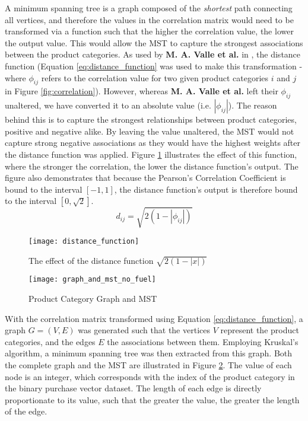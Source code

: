 A minimum spanning tree is a graph composed of the \textit{shortest} path connecting all vertices, and therefore the values in the correlation matrix would need to be transformed via a function such that the higher the correlation value, the lower the output value. This would allow the MST to capture the strongest associations between the product categories. As used by \textbf{M. A. Valle et al.} in , the distance function (Equation \ref{eq:distance_function}  was used to make this transformation - where $\phi_{ij}$ refers to the correlation value for two given product categories $i$ and $j$ in Figure \ref{fig:correlation}). However, whereas \textbf{M. A. Valle et al.} left their $\phi_{ij}$ unaltered, we have converted it to an absolute value (i.e. $|\phi_{ij}|$). The reason behind this is to capture the strongest relationships between product categories, positive and negative alike. By leaving the value unaltered, the MST would not capture strong negative associations as they would have the highest weights after the distance function was applied. Figure \ref{fig:distance_function} illustrates the effect of this function, where the stronger the correlation, the lower the distance function's output. The figure also demonstrates that because the Pearson's Correlation Coefficient is bound to the interval $[-1,1]$, the distance function's output is therefore bound to the interval $[0,\sqrt{2}]$. 
\begin{equation}
\label{eq:distance_function}
d_{ij} = \sqrt{2(1-|\phi_{ij}|)}
\end{equation}

\begin{figure}[H]
\centering
\texttt{[image: distance\_function]}
\label{fig:distance_function}
\caption{The effect of the distance function $\sqrt{2(1-|x|)}$}
\end{figure}

\begin{figure}[H]
\centering
\texttt{[image: graph\_and\_mst\_no\_fuel]}
\caption{Product Category Graph and MST}
\label{fig:graph_mst}
\end{figure}
With the correlation matrix transformed using Equation \ref{eq:distance_function}, a graph $G = (V,E)$ was generated such that the vertices $V$ represent the product categories, and the edges $E$ the associations between them. Employing Kruskal's algorithm, a minimum spanning tree was then extracted from this graph. Both the complete graph and the MST are illustrated in Figure \ref{fig:graph_mst}. The value of each node is an integer, which corresponds with the index of the product category in the binary purchase vector dataset. The length of each edge is directly proportionate to its value, such that the greater the value, the greater the length of the edge.



